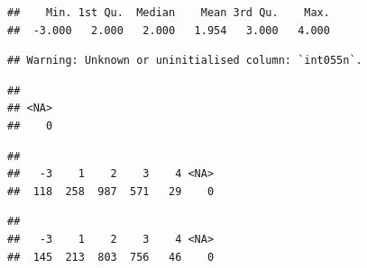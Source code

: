 \documentclass[
]{book}
\newenvironment{Shaded}{\begin{snugshade}}{\end{snugshade}}
\newcommand{\DataTypeTok}[1]{\textcolor[rgb]{0.13,0.29,0.53}{#1}}
\newcommand{\KeywordTok}[1]{\textcolor[rgb]{0.13,0.29,0.53}{\textbf{#1}}}
\newcommand{\NormalTok}[1]{#1}
\newcommand{\OperatorTok}[1]{\textcolor[rgb]{0.81,0.36,0.00}{\textbf{#1}}}
\newcommand{\StringTok}[1]{\textcolor[rgb]{0.31,0.60,0.02}{#1}}
\begin{document}
\begin{Shaded}
\end{Shaded}

\begin{verbatim}
##    Min. 1st Qu.  Median    Mean 3rd Qu.    Max. 
##  -3.000   2.000   2.000   1.954   3.000   4.000
\end{verbatim}

\begin{Shaded}
\end{Shaded}

\begin{verbatim}
## Warning: Unknown or uninitialised column: `int055n`.
\end{verbatim}

\begin{verbatim}
## 
## <NA> 
##    0
\end{verbatim}

\begin{Shaded}
\end{Shaded}

\begin{verbatim}
## 
##   -3    1    2    3    4 <NA> 
##  118  258  987  571   29    0
\end{verbatim}

\begin{Shaded}
\end{Shaded}

\begin{verbatim}
## 
##   -3    1    2    3    4 <NA> 
##  145  213  803  756   46    0
\end{verbatim}
\end{document}

